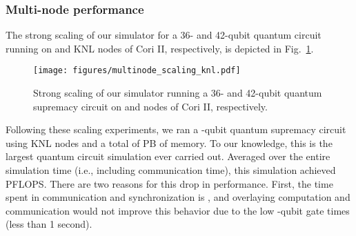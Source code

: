 \documentclass[sigconf]{acmart}
\begin{document}
\subsubsection{Multi-node performance}

The strong scaling of our simulator for a 36- and 42-qubit quantum circuit running on  and  KNL nodes of Cori II, respectively, is depicted in Fig.~\ref{fig:multinodescalingknl}.
\begin{figure}[t]
	\texttt{[image: figures/multinode\_scaling\_knl.pdf]}
	\caption{Strong scaling of our simulator running a 36- and 42-qubit quantum supremacy circuit on  and  nodes of Cori II, respectively.}
	\label{fig:multinodescalingknl}
\end{figure}
Following these scaling experiments, we ran a -qubit quantum supremacy circuit using  KNL nodes and a total of PB of memory. To our knowledge, this is the largest quantum circuit simulation ever carried out. Averaged over the entire simulation time (i.e., including communication time), this simulation achieved  PFLOPS. There are two reasons for this drop in performance. First, the time spent in communication and synchronization is , and overlaying computation and communication would not improve this behavior due to the low -qubit gate times (less than 1 second).
\end{document}
